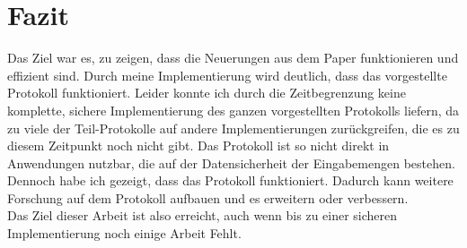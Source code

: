 \chapter{Fazit}

Das Ziel war es, zu zeigen, dass die Neuerungen aus dem Paper \cite{Doettling2021} funktionieren und effizient sind. Durch meine Implementierung wird deutlich, dass das vorgestellte Protokoll funktioniert. 
Leider konnte ich durch die Zeitbegrenzung keine komplette, sichere Implementierung des ganzen vorgestellten Protokolls liefern, da zu viele der Teil-Protokolle auf andere Implementierungen zurückgreifen, die es zu diesem Zeitpunkt noch nicht gibt.
Das Protokoll ist so nicht direkt in Anwendungen nutzbar, die auf der Datensicherheit der Eingabemengen bestehen.
Dennoch habe ich gezeigt, dass das Protokoll funktioniert. Dadurch kann weitere Forschung auf dem Protokoll aufbauen und es erweitern oder verbessern.\\
Das Ziel dieser Arbeit ist also erreicht, auch wenn bis zu einer sicheren Implementierung noch einige Arbeit Fehlt.
